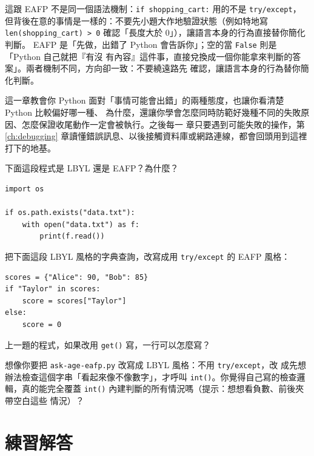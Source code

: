 這跟 EAFP 不是同一個語法機制：\texttt{if shopping\_cart:} 用的不是 \texttt{try/except}，
但背後在意的事情是一樣的：不要先小題大作地驗證狀態（例如特地寫
\texttt{len(shopping\_cart) > 0} 確認「長度大於 0」），讓語言本身的行為直接替你簡化判斷。
EAFP 是「先做，出錯了 Python 會告訴你」；空的當 \texttt{False} 則是「Python 自己就把『有沒
有內容』這件事，直接兌換成一個你能拿來判斷的答案」。兩者機制不同，方向卻一致：不要繞遠路先
確認，讓語言本身的行為替你簡化判斷。


這一章教會你 Python 面對「事情可能會出錯」的兩種態度，也讓你看清楚 Python 比較偏好哪一種、
為什麼，還讓你學會怎麼同時防範好幾種不同的失敗原因、怎麼保證收尾動作一定會被執行。之後每一
章只要遇到可能失敗的操作，第 \ref{ch:debugging} 章讀懂錯誤訊息、以後接觸資料庫或網路連線，都會回頭用到這裡
打下的地基。

\begin{drills}[label=drills:eafp-recap]
\item 下面這段程式是 LBYL 還是 EAFP？為什麼？
\begin{verbatim}
import os

if os.path.exists("data.txt"):
    with open("data.txt") as f:
        print(f.read())
\end{verbatim}
\item 把下面這段 LBYL 風格的字典查詢，改寫成用 \texttt{try/except} 的 EAFP 風格：
\begin{verbatim}
scores = {"Alice": 90, "Bob": 85}
if "Taylor" in scores:
    score = scores["Taylor"]
else:
    score = 0
\end{verbatim}
\item 上一題的程式，如果改用 \texttt{get()} 寫，一行可以怎麼寫？
\item 想像你要把 \texttt{ask-age-eafp.py} 改寫成 LBYL 風格：不用 \texttt{try/except}，改
成先想辦法檢查這個字串「看起來像不像數字」，才呼叫 \texttt{int()}。你覺得自己寫的檢查邏
輯，真的能完全覆蓋 \texttt{int()} 內建判斷的所有情況嗎（提示：想想看負數、前後夾帶空白這些
情況）？
\end{drills}

\section*{練習解答}

